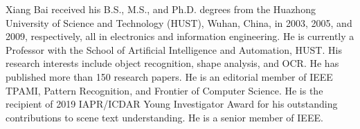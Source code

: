 \documentclass[journal]{IEEEtran}
\begin{document}
\begin{IEEEbiography}{Xiang Bai} received his B.S., M.S., and Ph.D. degrees from the Huazhong University of Science
and Technology (HUST), Wuhan, China, in 2003,
2005, and 2009, respectively, all in electronics and
information engineering. He is currently a Professor
with the School of Artificial Intelligence and Automation, HUST. His research interests include
object recognition, shape analysis, and OCR. He
has published more than 150 research papers. He
is an editorial member of IEEE TPAMI, Pattern
Recognition, and Frontier of Computer Science. He
is the recipient of 2019 IAPR/ICDAR Young Investigator Award for his outstanding contributions to scene text understanding. He is a senior member of IEEE.
\end{IEEEbiography}



\vfill
\end{document}
